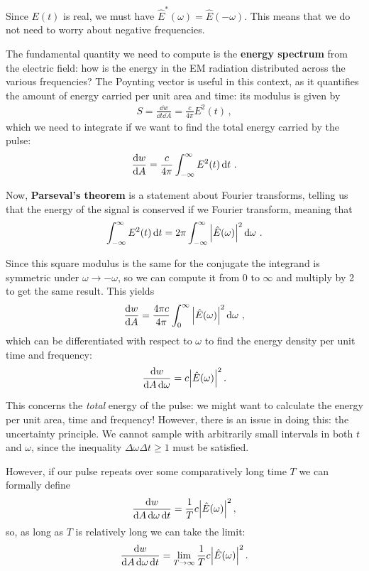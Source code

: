 \documentclass[main.tex]{subfiles}
\begin{document}
Since \(E(t)\) is real, we must have \(\hat{E}^{*}(\omega ) = \hat{E} (- \omega )\). 
This means that we do not need to worry about negative frequencies. 

The fundamental quantity we need to compute is the \textbf{energy spectrum} from the electric field: how is the energy in the EM radiation distributed across the various frequencies? 
The Poynting vector is useful in this context, as it quantifies the amount of energy carried per unit area and time: its modulus is given by 
%
\begin{align}
S = \frac{ \dd{w}}{ \dd{t} \dd{A}} = \frac{c}{4 \pi } E^2(t)
\,,
\end{align}
%
which we need to integrate if we want to find the total energy carried by the pulse: 
%
\begin{align}
\dv{w}{A} = \frac{c}{4 \pi } \int_{- \infty }^{\infty} E^2(t) \dd{t}
\,.
\end{align}

Now, \textbf{Parseval's theorem} is a statement about Fourier transforms, telling us that the energy of the signal is conserved if we Fourier transform, meaning that 
%
\begin{align}
\int_{- \infty }^{\infty } E^2(t) \dd{t} = 2 \pi \int_{-\infty}^{\infty} \abs{\hat{E}(\omega )}^2 \dd{\omega}
\,.
\end{align}

Since this square modulus is the same for the conjugate the integrand is symmetric under \(\omega \to - \omega \), so we can compute it from 0 to \(\infty \) and multiply by 2 to get the same result. This yields 
%
\begin{align}
\dv{w}{A} = \frac{4 \pi c}{4 \pi } \int_{0}^{\infty }\abs{\hat{E}(\omega )}^2 \dd{\omega}
\,,
\end{align}
%
which can be differentiated with respect to \(\omega \) to find the energy density per unit time and frequency:
%
\begin{align}
\frac{ \dd{w}}{ \dd{A} \dd{\omega }} = c \abs{\hat{E}(\omega )}^2
\,.
\end{align}

This concerns the \emph{total} energy of the pulse: we might want to calculate the energy per unit area, time and frequency! 
However, there is an issue in doing this: the uncertainty principle. We cannot sample with arbitrarily small intervals in both \(t\) and \(\omega \), since the inequality \(\Delta \omega \Delta t \geq 1\) must be satisfied. 

However, if our pulse repeats over some comparatively long time \(T\) we can formally define 
%
\begin{align}
\frac{ \dd{w}}{ \dd{A} \dd{\omega } \dd{t}} = \frac{1}{T} c \abs{\hat{E}(\omega )}^2
\,,
\end{align}
%
so, as long as \(T\) is relatively long we can take the limit:
%
\begin{align}
\frac{ \dd{w}}{ \dd{A} \dd{\omega } \dd{t}} = \lim_{T \to \infty  } \frac{1}{T} c \abs{\hat{E}(\omega )}^2
\,.
\end{align}
\end{document}
